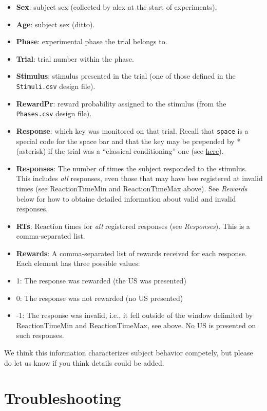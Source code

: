 \documentclass[11pt,]{article}
\begin{document}
\begin{itemize}
\item
  \textbf{Sex}: subject sex (collected by alex at the start of
  experiments).
\item
  \textbf{Age}: subject sex (ditto).
\item
  \textbf{Phase}: experimental phase the trial belongs to.
\item
  \textbf{Trial}: trial number within the phase.
\item
  \textbf{Stimulus}: stimulus presented in the trial (one of those
  defined in the \texttt{Stimuli.csv} design file).
\item
  \textbf{RewardPr}: reward probability assigned to the stimulus (from
  the \texttt{Phases.csv} design file).
\item
  \textbf{Response}: which key was monitored on that trial. Recall that
  \texttt{space} is a special code for the space bar and that the key
  may be prepended by * (asterisk) if the trial was a ``classical
  conditioning'' one (see \hyperref[responses]{here}).
\item
  \textbf{Responses}: The number of times the subject responded to the
  stimulus. This includes \emph{all} responses, even those that may have
  bee registered at invalid times (see ReactionTimeMin and
  ReactionTimeMax above). See \emph{Rewards} below for how to obtaine
  detailed information about valid and invalid responses.
\item
  \textbf{RTs}: Reaction times for \emph{all} registered responses (see
  \emph{Responses}). This is a comma-separated list.
\item
  \textbf{Rewards}: A comma-separated list of rewards received for each
  response. Each element has three possible values:
\item
  1: The response was rewarded (the US was presented)
\item
  0: The response was not rewarded (no US presented)
\item
  -1: The response was invalid, i.e., it fell outside of the window
  delimited by ReactionTimeMin and ReactionTimeMax, see above. No US is
  presented on such responses.
\end{itemize}

We think this information characterizes subject behavior competely, but
please do let us know if you think details could be added.

\section{Troubleshooting}
\end{document}

